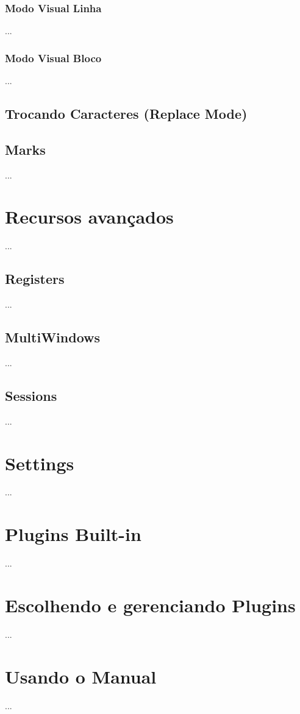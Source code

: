 \documentclass[a4paper, 12pt]{article}
\begin{document}
\subsubsection{Modo Visual Linha}
...
\subsubsection{Modo Visual Bloco}
...
\subsection{Trocando Caracteres (Replace Mode)}



\subsection{Marks}
...

\newpage
\section{Recursos avançados}
...
\subsection{Registers}
...

\subsection{MultiWindows}
...

\subsection{Sessions}
...
\newpage

\section{Settings}
...
\newpage

\section{Plugins Built-in}
...
\newpage

\section{Escolhendo e gerenciando Plugins}
...
\newpage

\section{Usando o Manual}
...
\newpage
\end{document}
